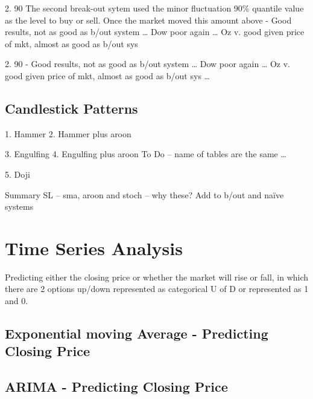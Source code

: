 

2.	90%
The second break-out sytem used the minor fluctuation 90\% quantile value as the level to buy or sell. Once the market moved this amount above
-	Good results, not as good as b/out system … Dow poor again … Oz v. good given price of mkt, almost as good as b/out sys 

2.	90%
-	Good results, not as good as b/out system … Dow poor again … Oz v. good given price of mkt, almost as good as b/out sys …

\subsection{Candlestick Patterns}
1.	Hammer
2.	Hammer plus aroon

3.	Engulfing
4.	Engulfing plus aroon
To Do – name of tables are the same …

5.	Doji


Summary
SL – sma, aroon and stoch – why these?  Add to b/out and naïve systems



\section{Time Series Analysis}
Predicting either the closing price or whether the market will rise or fall, in which there are 2 options up/down represented as categorical U of D or represented as 1 and 0.

\subsection{Exponential moving Average - Predicting Closing Price}


\subsection{ARIMA - Predicting Closing Price}


